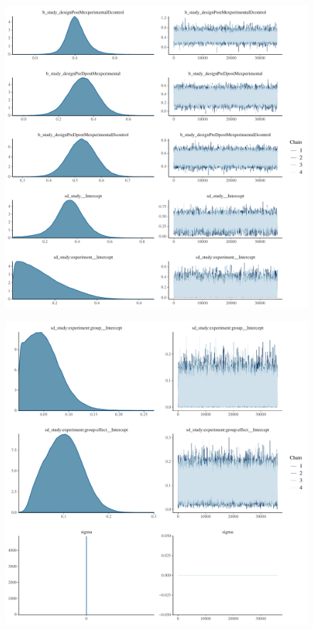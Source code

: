 \documentclass[
]{report}
\begin{document}
\begin{figure}

{\centering \includegraphics[width=1\textwidth,height=\textheight]{diagnostic_plots_files/figure-pdf/unnamed-chunk-29-1.pdf}

}

\end{figure}

\begin{figure}

{\centering \includegraphics[width=1\textwidth,height=\textheight]{diagnostic_plots_files/figure-pdf/unnamed-chunk-29-2.pdf}

}

\end{figure}
\end{document}
